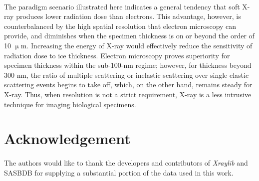 \documentclass[]{article}
\newcommand\micron{$\upmu$m}
\begin{document}
\paragraph{} The paradigm scenario illustrated here indicates a general tendency that soft X-ray produces lower radiation dose than electrons. This advantage, however, is counterbalanced by the high spatial resolution that electron microscopy can provide, and diminishes when the specimen thickness is on or beyond the order of 10 \micron. Increasing the energy of X-ray would effectively reduce the sensitivity of radiation dose to ice thickness. Electron microscopy proves superiority for specimen thickness within the sub-100-nm regime; however, for thickness beyond 300 nm, the ratio of multiple scattering or inelastic scattering over single elastic scattering events begins to take off, which, on the other hand, remains steady for X-ray. Thus, when resolution is not a strict requirement, X-ray is a less intrusive technique for imaging biological specimens. 



\section{Acknowledgement}
\paragraph{} The authors would like to thank the developers and contributors of \textit{Xraylib} and SASBDB for supplying a substantial portion of the data used in this work. 

{}

\end{document}
